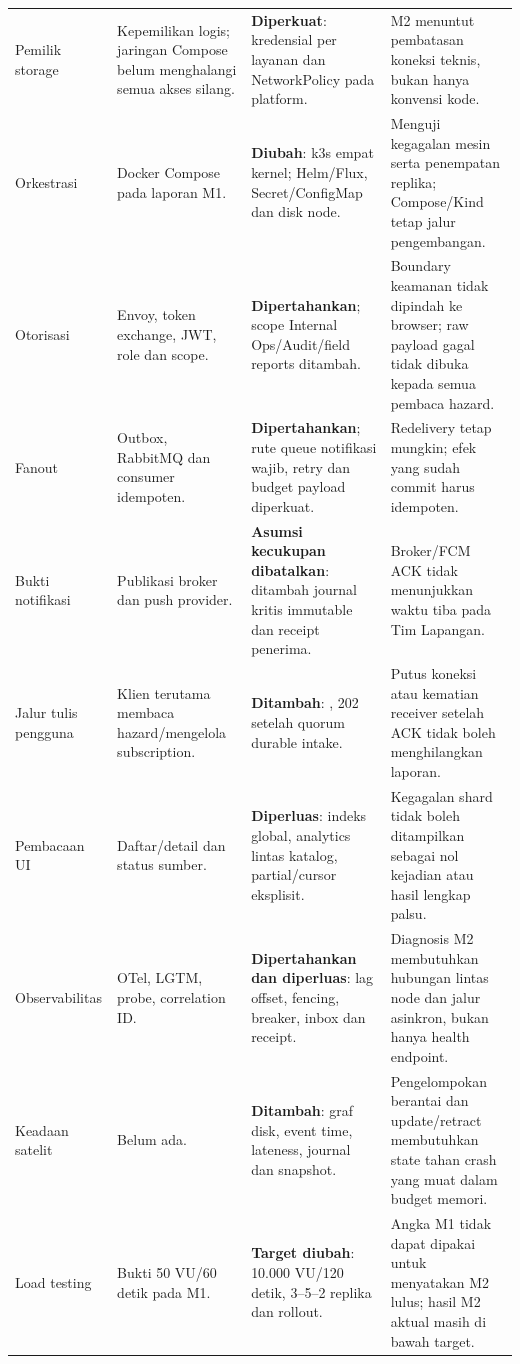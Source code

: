 \begin{longtable}{@{}P{2.2cm}P{3.65cm}P{4.2cm}P{5.05cm}@{}}
Pemilik storage & Kepemilikan logis; jaringan Compose belum menghalangi semua akses silang. & \textbf{Diperkuat}: kredensial per layanan dan NetworkPolicy pada platform. & M2 menuntut pembatasan koneksi teknis, bukan hanya konvensi kode.\\
Orkestrasi & Docker Compose pada laporan M1. & \textbf{Diubah}: k3s empat kernel; Helm/Flux, Secret/ConfigMap dan disk node. & Menguji kegagalan mesin serta penempatan replika; Compose/Kind tetap jalur pengembangan.\\
Otorisasi & Envoy, token exchange, JWT, role dan scope. & \textbf{Dipertahankan}; scope Internal Ops/Audit/field reports ditambah. & Boundary keamanan tidak dipindah ke browser; raw payload gagal tidak dibuka kepada semua pembaca hazard.\\
Fanout & Outbox, RabbitMQ dan consumer idempoten. & \textbf{Dipertahankan}; rute queue notifikasi wajib, retry dan budget payload diperkuat. & Redelivery tetap mungkin; efek yang sudah commit harus idempoten.\\
Bukti notifikasi & Publikasi broker dan push provider. & \textbf{Asumsi kecukupan dibatalkan}: ditambah journal kritis immutable dan receipt penerima. & Broker/FCM ACK tidak menunjukkan waktu tiba pada Tim Lapangan.\\
Jalur tulis pengguna & Klien terutama membaca hazard/mengelola subscription. & \textbf{Ditambah}: , 202 setelah quorum durable intake. & Putus koneksi atau kematian receiver setelah ACK tidak boleh menghilangkan laporan.\\
Pembacaan UI & Daftar/detail dan status sumber. & \textbf{Diperluas}: indeks global, analytics lintas katalog, partial/cursor eksplisit. & Kegagalan shard tidak boleh ditampilkan sebagai nol kejadian atau hasil lengkap palsu.\\
Observa\-bilitas & OTel, LGTM, probe, correlation ID. & \textbf{Dipertahankan dan diperluas}: lag offset, fencing, breaker, inbox dan receipt. & Diagnosis M2 membutuhkan hubungan lintas node dan jalur asinkron, bukan hanya health endpoint.\\
Keadaan satelit & Belum ada. & \textbf{Ditambah}: graf disk, event time, lateness, journal dan snapshot. & Pengelompokan berantai dan update/retract membutuhkan state tahan crash yang muat dalam budget memori.\\
Load testing & Bukti 50 VU/60 detik pada M1. & \textbf{Target diubah}: 10.000 VU/120 detik, 3--5--2 replika dan rollout. & Angka M1 tidak dapat dipakai untuk menyatakan M2 lulus; hasil M2 aktual masih di bawah target.\\\bottomrule
\end{longtable}

